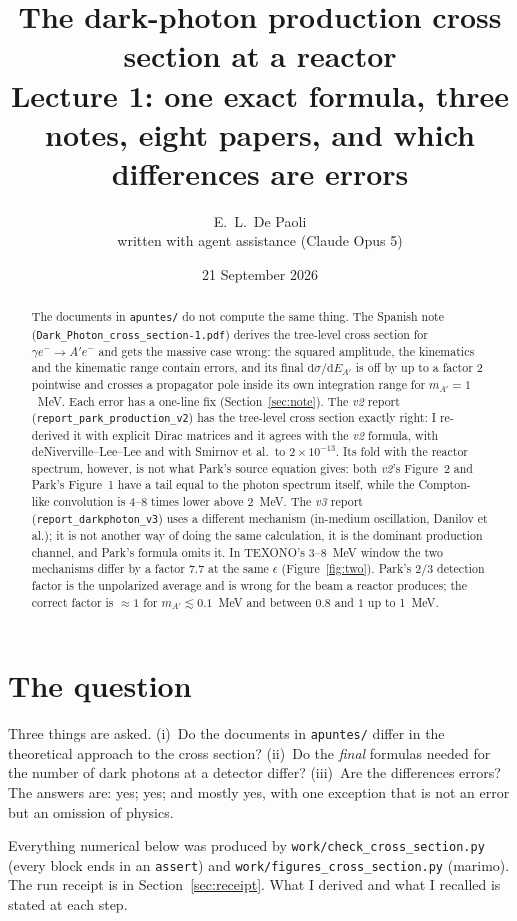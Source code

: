 \documentclass[11pt,a4paper]{article}
\title{The dark-photon production cross section at a reactor\\[2pt]
\large Lecture 1: one exact formula, three notes, eight papers, and which differences are errors}
\author{E.~L.~De Paoli\\[2pt]\small written with agent assistance (Claude Opus 5)}
\date{21 September 2026}
\newcommand{\Ap}{A'}
\newcommand{\eps}{\epsilon}
\newcommand{\dd}{\mathrm{d}}
\begin{document}
\maketitle

\begin{abstract}
\noindent\sloppy
The documents in \texttt{apuntes/} do not compute the same thing. The Spanish note
(\texttt{Dark\_Photon\_cross\_section-1.pdf}) derives the tree-level cross section for $\gamma e^-\to \Ap e^-$ and gets
the massive case wrong: the squared amplitude, the kinematics and the kinematic range contain errors, and its final
$\dd\sigma/\dd E_{\Ap}$ is off by up to a factor 2 pointwise and crosses a propagator pole inside its own integration
range for $m_{\Ap}=1$~MeV. Each error has a one-line fix (Section~\ref{sec:note}). The \emph{v2} report
(\texttt{report\_park\_production\_v2}) has the tree-level cross section exactly right: I re-derived it with explicit Dirac
matrices and it agrees with the \emph{v2} formula, with deNiverville--Lee--Lee and with Smirnov et al.\ to
$2\times10^{-13}$. Its fold with the reactor spectrum, however, is not what Park's source equation gives: both \emph{v2}'s
Figure~2 and Park's Figure~1 have a tail equal to the photon spectrum itself, while the Compton-like convolution is
4--8 times lower above 2~MeV. The \emph{v3} report (\texttt{report\_darkphoton\_v3}) uses a different mechanism
(in-medium oscillation, Danilov et al.); it is not another way of doing the same calculation, it is the dominant production
channel, and Park's formula omits it. In TEXONO's 3--8~MeV window the two mechanisms differ by a factor $7.7$ at the same
$\eps$ (Figure~\ref{fig:two}). Park's $2/3$ detection factor is the unpolarized average and is wrong for the beam a reactor
produces; the correct factor is $\approx1$ for $m_{\Ap}\lesssim0.1$~MeV and between $0.8$ and $1$ up to 1~MeV.
\end{abstract}

\section{The question}
Three things are asked. (i)~Do the documents in \texttt{apuntes/} differ in the theoretical approach to the cross section?
(ii)~Do the \emph{final} formulas needed for the number of dark photons at a detector differ? (iii)~Are the differences
errors? The answers are: yes; yes; and mostly yes, with one exception that is not an error but an omission of physics.

Everything numerical below was produced by \texttt{work/check\_cross\_section.py} (every block ends in an
\texttt{assert}) and \texttt{work/figures\_cross\_section.py} (marimo). The run receipt is in
Section~\ref{sec:receipt}. What I derived and what I recalled is stated at each step.
\end{document}
